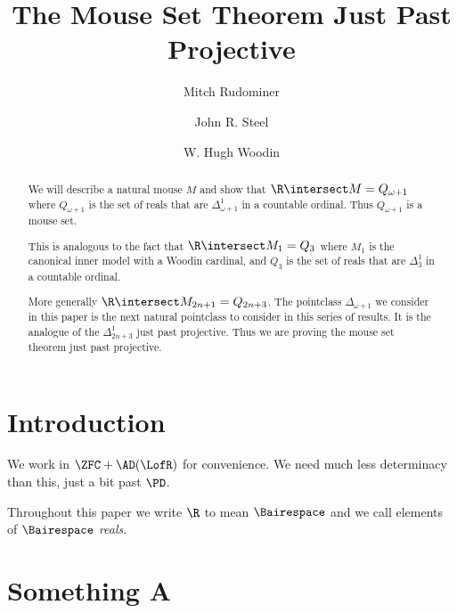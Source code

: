 \documentclass[oneside,12pt]{amsart}
\begin{document}
\title{The Mouse Set Theorem Just Past Projective}
\author{Mitch Rudominer}
\author{John R. Steel}
\author{W. Hugh Woodin}



\begin{abstract}
We will describe a natural mouse $M$ and show that $\R\intersect M = Q_{\omega+1}$
where $Q_{\omega+1}$  is the set of reals that are
$\Delta^1_{\omega+1}$ in a countable ordinal. Thus $Q_{\omega+1}$
is a mouse set.

This is analogous to the fact that $\R\intersect M_1 = Q_3$ where $M_1$ is the
canonical inner model with a Woodin cardinal, and $Q_3$ is the set of reals
that are $\Delta^1_3$ in a countable ordinal.

More generally $\R\intersect M_{2n+1} = Q_{2n+3}$.
The pointclass $\Delta_{\omega+1}$  we consider in this paper is the next natural
pointclass to consider in this series of results. It is the analogue of
the $\Delta^1_{2n+3}$ just past projective. Thus we are proving the mouse
set theorem just past projective.
\end{abstract}

\maketitle

\tableofcontents

\section{Introduction}
\label{section:intro}

We work in $\ZFC+\AD(\LofR)$ for convenience. We need much less determinacy
than this, just a bit past $\PD$.

Throughout this paper we write $\R$ to mean $\Bairespace$ and we call elements of $\Bairespace$ \emph{reals}.

\section{Something A}
\label{section:somethinga}
\end{document}
